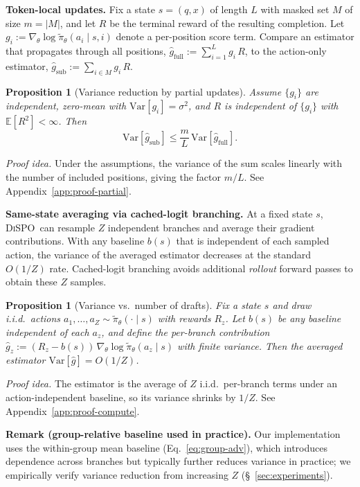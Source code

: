 \documentclass{article}
\newcommand{\method}{{\textsc{DiSPO}}}
\theoremstyle{plain}
\newtheorem{proposition}[theorem]{Proposition}
\theoremstyle{definition}
\theoremstyle{remark}
\begin{document}
\textbf{Token-local updates.}
Fix a state $s=(q,x)$ of length $L$ with masked set $M$ of size $m=|M|$, and let $R$ be the terminal reward of the resulting completion.
Let $g_i := \nabla_\theta \log \tilde{\pi}_\theta(a_i\mid s,i)$ denote a per-position score term.
Compare an estimator that propagates through all positions,
$\hat g_{\text{full}} := \sum_{i=1}^L g_i\,R$,
to the action-only estimator,
$\hat g_{\text{sub}} := \sum_{i\in M} g_i\,R$.

\begin{proposition}[Variance reduction by partial updates]
\label{prop:var}
Assume $\{g_i\}$ are independent, zero-mean with $\mathrm{Var}[g_i]=\sigma^2$, and $R$ is independent of $\{g_i\}$ with $\mathbb{E}[R^2]<\infty$.
Then
\[
  \mathrm{Var}[\hat g_{\text{sub}}]
  \le
  \frac{m}{L}\,\mathrm{Var}[\hat g_{\text{full}}].
\]
\end{proposition}

\emph{Proof idea.}
Under the assumptions, the variance of the sum scales linearly with the number of included positions, giving the factor $m/L$.
See Appendix~\ref{app:proof-partial}.


\textbf{Same-state averaging via cached-logit branching.}
At a fixed state $s$, \method\ can resample $Z$ independent branches and average their gradient contributions.
With any baseline $b(s)$ that is independent of each sampled action, the variance of the averaged estimator decreases at the standard $O(1/Z)$ rate.
Cached-logit branching avoids additional \emph{rollout} forward passes to obtain these $Z$ samples.

\begin{proposition}[Variance vs.\ number of drafts]
\label{prop:compute}
Fix a state $s$ and draw i.i.d.\ actions $a_1,\dots,a_Z \sim \tilde{\pi}_\theta(\cdot\mid s)$ with rewards $R_z$.
Let $b(s)$ be any baseline independent of each $a_z$, and define the per-branch contribution
$\hat g_z := (R_z-b(s))\,\nabla_\theta \log \tilde{\pi}_\theta(a_z\mid s)$ with finite variance.
Then the averaged estimator $\mathrm{Var}[\hat g] = O(1/Z)$.
\end{proposition}


\emph{Proof idea.}
The estimator is the average of $Z$ i.i.d.\ per-branch terms under an action-independent baseline, so its variance shrinks by $1/Z$.
See Appendix~\ref{app:proof-compute}.

\noindent\textbf{Remark (group-relative baseline used in practice).}
Our implementation uses the within-group mean baseline (Eq.~\ref{eq:group-adv}), which introduces dependence across branches but typically further reduces variance in practice; we empirically verify variance reduction from increasing $Z$ (\S~\ref{sec:experiments}).
\end{document}
